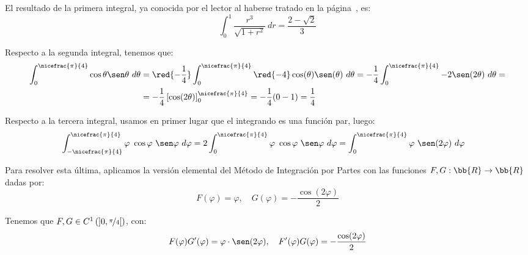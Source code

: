\begin{ejercicio}
\begin{description}
        El resultado de la primera integral, ya conocida por el lector al haberse tratado en la página~\pageref{desc:optInt}, es:
        \begin{equation*}
            \int_0^1 \dfrac{r^3}{\sqrt{1+r^2}}~dr = \dfrac{2-\sqrt{2}}{3}
        \end{equation*}

        Respecto a la segunda integral, tenemos que:
        \begin{align*}
            \int_0^{\nicefrac{\pi}{4}} \cos\theta\sen\theta~d\theta &= \red{-\dfrac{1}{4}}\int_0^{\nicefrac{\pi}{4}} \red{-4}\cos(\theta)\sen(\theta)~d\theta = -\dfrac{1}{4}\int_0^{\nicefrac{\pi}{4}} -2\sen(2\theta)~d\theta =\\
            &= -\dfrac{1}{4}\left[\cos(2\theta)\right]_0^{\nicefrac{\pi}{4}} = -\dfrac{1}{4}(0-1) = \dfrac{1}{4}
        \end{align*}

        Respecto a la tercera integral, usamos en primer lugar que el integrando es una función par, luego:
        \begin{align*}
            \int_{-\nicefrac{\pi}{4}}^{\nicefrac{\pi}{4}} \varphi~\cos\varphi~\sen\varphi~d\varphi &= 2\int_{0}^{\nicefrac{\pi}{4}} \varphi~\cos\varphi~\sen\varphi~d\varphi = \int_{0}^{\nicefrac{\pi}{4}} \varphi~\sen(2\varphi)~d\varphi
        \end{align*}

        Para resolver esta última, aplicamos la versión elemental del Método de Integración por Partes con las funciones $F,G:\bb{R}\to \bb{R}$ dadas por:
        \begin{equation*}
            F(\varphi) = \varphi, \quad G(\varphi) = -\dfrac{\cos(2\varphi)}{2}
        \end{equation*}

        Tenemos que $F,G\in C^1\left(\left]0, \nicefrac{\pi}{4}\right[\right)$, con:
        \begin{equation*}
            F(\varphi)G'(\varphi) = \varphi\cdot \sen(2\varphi), \quad F'(\varphi)G(\varphi) = -\dfrac{\cos(2\varphi)}{2}
        \end{equation*}


\end{description}
\end{ejercicio}
